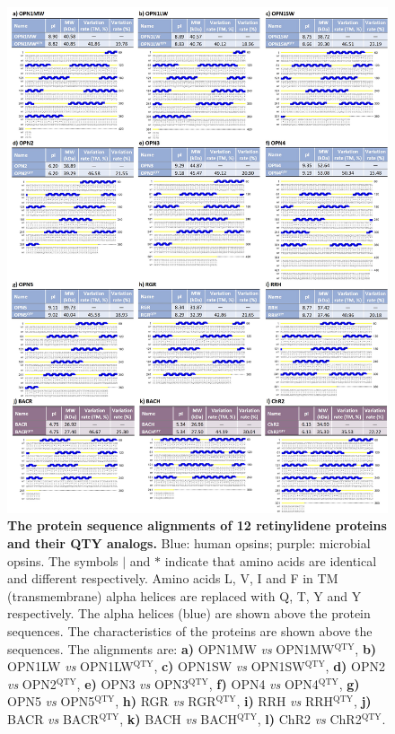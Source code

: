 \documentclass[fleqn, 10pt, lineno]{manuscript}
\begin{document}
\begin{figure}[htbp]
	\centering
	\includegraphics[width=\linewidth]{Figures/sequences.jpg}
	\caption{\textbf{The protein sequence alignments of 12 retinylidene proteins and their QTY analogs. } Blue: human opsins; purple: microbial opsins. The symbols $|$ and $*$ indicate that amino acids are identical and different respectively. Amino acids L, V, I and F in TM (transmembrane) alpha helices are replaced with Q, T, Y and Y respectively. The alpha helices (blue) are shown above the protein sequences. The characteristics of the proteins are shown above the sequences. 
    The alignments are: 
    \textbf{a)} OPN1MW \textit{vs} OPN1MW$^{\textrm{QTY}}$, 
    \textbf{b)} OPN1LW \textit{vs} OPN1LW$^{\textrm{QTY}}$, 
    \textbf{c)} OPN1SW \textit{vs} OPN1SW$^{\textrm{QTY}}$, 
    \textbf{d)} OPN2 \textit{vs} OPN2$^{\textrm{QTY}}$, 
    \textbf{e)} OPN3 \textit{vs} OPN3$^{\textrm{QTY}}$, 
    \textbf{f)} OPN4 \textit{vs} OPN4$^{\textrm{QTY}}$, 
    \textbf{g)} OPN5 \textit{vs} OPN5$^{\textrm{QTY}}$, 
    \textbf{h)} RGR \textit{vs} RGR$^{\textrm{QTY}}$, 
    \textbf{i)} RRH \textit{vs} RRH$^{\textrm{QTY}}$, 
    \textbf{j)} BACR \textit{vs} BACR$^{\textrm{QTY}}$, 
    \textbf{k)} BACH \textit{vs} BACH$^{\textrm{QTY}}$, 
    \textbf{l)} ChR2 \textit{vs} ChR2$^{\textrm{QTY}}$. }
	\label{fig:sequences}
\end{figure}
\end{document}
